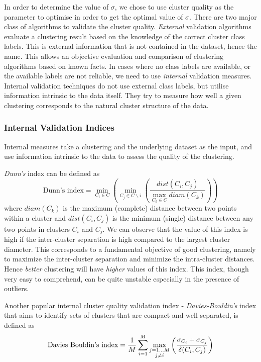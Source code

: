 In order to determine the value of $\sigma$, we chose to use cluster quality as the parameter to optimise in order to get the optimal value of $\sigma$. There are two major class of algorithms 
to validate the cluster quality. \textit{External} validation algorithms evaluate a clustering result based on the knowledge of the correct 
cluster class labels. This is external information that is not contained in the dataset, hence the name. This allows an objective evaluation and comparison of clustering algorithms based on known facts. In cases where no class labels are available, or the available labels are not reliable, 
we need to use \textit{internal} validation measures. Internal validation techniques do not use external class labels, but utilise information intrinsic to the data itself. They try to measure how well a given clustering corresponds to the natural cluster structure of the data.


\subsubsection{Internal Validation Indices} \label{chap2:subsec:cluster_validity_internal}
Internal measures take a clustering and the underlying dataset as the input, and use information intrinsic to the data to assess the quality of the clustering. 

\textit{Dunn's} index can be defined as 
\[
\text{Dunn's index}= \min_{C_{i}\in C} \left( \min_{C_{j} \in C \backslash i} \left( \frac{dist(C_{i},C_{j})}{\max_{C_{k}\in C}diam(C_{k})} \right) \right)
\]
where $diam(C_{k})$ is the maximum (complete) distance between two points within a cluster and $dist(C_{i},C_{j})$ is the minimum (single) distance between any two points in clusters $C_{i}$ and $C_{j}$. We can observe that the value of this index is high if the inter-cluster separation is high compared to the largest cluster diameter. This corresponds to a fundamental objective of good clustering, namely to maximize the inter-cluster separation and minimize the intra-cluster distances. Hence \textit{better} clustering will have \textit{higher} values of this index. This index, though very easy to comprehend, can be quite unstable especially in the presence of outliers. 

Another popular internal cluster quality validation index - \textit{Davies-Bouldin's} index that aims to identify sets of clusters that are compact and well separated, is defined as
\[
\text{Davies Bouldin's index}=\frac{1}{M} \sum_{i=1}^{M}\max_{\begin{subarray}{c}j=1\dots M \\ j\neq i \end{subarray}} \left( \frac{\sigma_{C_{i}}+\sigma_{C_{j}}}{\delta(C_{i},C_{j})} \right)
\]

